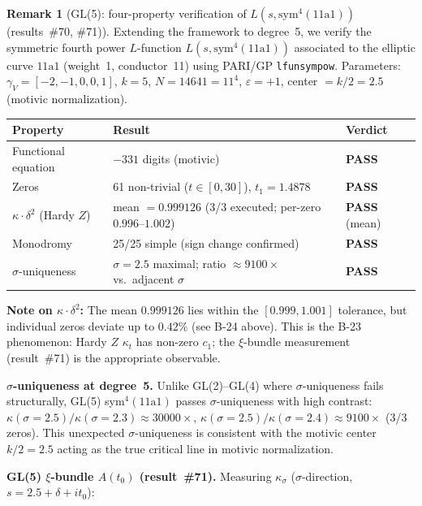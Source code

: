 \documentclass[11pt, a4paper]{article}
\theoremstyle{definition}
\newtheorem{remark}{Remark}[section]
\theoremstyle{plain}
\begin{document}
\begin{remark}[GL(5): four-property verification of $L(s, \mathrm{sym}^4(11\mathrm{a}1))$ (results~\#70, \#71)]
\label{rem:gl5_sym4}
Extending the framework to degree~5, we verify the symmetric fourth power
$L$-function $L(s, \mathrm{sym}^4(11\mathrm{a}1))$ associated to the elliptic curve
$11\mathrm{a}1$ (weight~1, conductor~11) using PARI/GP \texttt{lfunsympow}.
Parameters: $\gamma_V = [-2,-1,0,0,1]$, $k = 5$, $N = 14641 = 11^4$, $\varepsilon = +1$,
center $= k/2 = 2.5$ (motivic normalization).

\smallskip
\begin{center}
\small
\begin{tabular}{@{}lll@{}}
\toprule
Property & Result & Verdict \\
\midrule
Functional equation & $-331$ digits (motivic) & \textbf{PASS} \\
Zeros & 61 non-trivial ($t \in [0,30]$), $t_1 = 1.4878$ & \textbf{PASS} \\
$\kappa\cdot\delta^2$ (Hardy $Z$) & mean $= 0.999126$ (3/3 executed; per-zero $0.996$--$1.002$) & \textbf{PASS} (mean) \\
Monodromy & 25/25 simple (sign change confirmed) & \textbf{PASS} \\
$\sigma$-uniqueness & $\sigma = 2.5$ maximal; ratio $\approx 9100\times$ vs.\ adjacent $\sigma$ & \textbf{PASS} \\
\bottomrule
\end{tabular}
\end{center}
\smallskip\noindent
\textbf{Note on $\kappa\cdot\delta^2$:} The mean $0.999126$ lies within the $[0.999, 1.001]$
tolerance, but individual zeros deviate up to $0.42\%$ (see B-24 above).
This is the B-23 phenomenon: Hardy $Z$ $\kappa_t$ has non-zero $c_1$; the $\xi$-bundle
measurement (result~\#71) is the appropriate observable.

\textbf{$\sigma$-uniqueness at degree~5.}
Unlike GL(2)--GL(4) where $\sigma$-uniqueness fails structurally,
GL(5) sym$^4(11\mathrm{a}1)$ passes $\sigma$-uniqueness with high contrast:
$\kappa(\sigma{=}2.5) / \kappa(\sigma{=}2.3) \approx 30000\times$,
$\kappa(\sigma{=}2.5) / \kappa(\sigma{=}2.4) \approx 9100\times$ (3/3 zeros).
This unexpected $\sigma$-uniqueness is consistent with the motivic center $k/2 = 2.5$
acting as the true critical line in motivic normalization.

\textbf{GL(5) $\xi$-bundle $A(t_0)$ (result~\#71).}
Measuring $\kappa_\sigma$ ($\sigma$-direction, $s = 2.5 + \delta + it_0$):


\end{remark}
\end{document}

